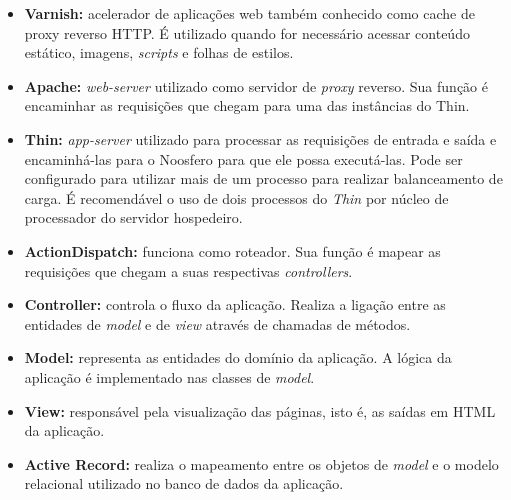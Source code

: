 \begin{itemize}
    \item \textbf{Varnish:} acelerador de aplicações web também conhecido
    como cache de proxy reverso HTTP. É utilizado quando for necessário
    acessar conteúdo estático, imagens, \textit{scripts} e folhas de estilos.

    \item \textbf{Apache:} \textit{web-server} utilizado como servidor de
    \textit{proxy} reverso. Sua função é encaminhar as requisições que
    chegam para uma das instâncias do Thin.

    \item \textbf{Thin:} \textit{app-server} utilizado para processar as
    requisições de entrada e saída e encaminhá-las para o Noosfero para que
    ele possa executá-las. Pode ser configurado para utilizar mais de um
    processo para realizar balanceamento de carga. É recomendável o uso de
    dois processos do \textit{Thin} por núcleo de processador do servidor
    hospedeiro.

    \item \textbf{ActionDispatch:} funciona como roteador. Sua função é
    mapear as requisições que chegam a suas respectivas \textit{controllers}.

    \item \textbf{Controller:} controla o fluxo da aplicação. Realiza a
    ligação entre as entidades de \textit{model} e de \textit{view} através
    de chamadas de métodos.

    \item \textbf{Model:} representa as entidades do domínio da aplicação.
    A lógica da aplicação é implementado nas classes de \textit{model}.

    \item \textbf{View:} responsável pela visualização das páginas, isto é,
    as saídas em HTML da aplicação.

    \item \textbf{Active Record:} realiza o mapeamento entre os objetos de
    \textit{model} e o modelo relacional utilizado no banco de dados da
    aplicação.

\end{itemize}

